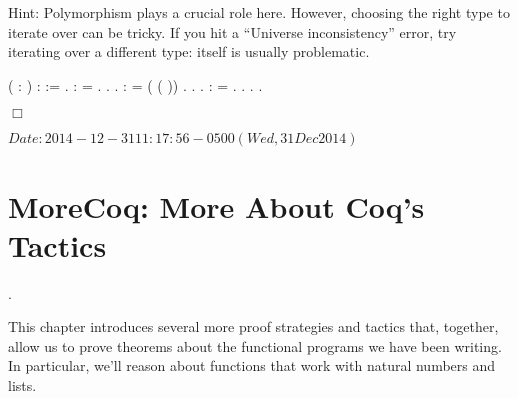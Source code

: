 \documentclass[12pt]{report}
\begin{document}
 Hint: Polymorphism plays a crucial role here. However, choosing
    the right type to iterate over can be tricky. If you hit a
    ``Universe inconsistency'' error, try iterating over a different
    type:  itself is usually problematic. \begin{coqdoccode}
\coqdocemptyline
\coqdocnoindent
{}  (  : ) :  :=\coqdoceol
\coqdocindent{1.00em}
 .\coqdoceol
\coqdocemptyline
\coqdocnoindent
{}  :    =   .\coqdoceol
\coqdocnoindent
{}.  .\coqdoceol
\coqdocemptyline
\coqdocnoindent
{}  :    =  (  (  )) .\coqdoceol
\coqdocnoindent
{}.  .\coqdoceol
\coqdocemptyline
\coqdocnoindent
{}  :    = .\coqdoceol
\coqdocnoindent
{}.  .\coqdoceol
\coqdocemptyline
\coqdocnoindent
{} .\coqdoceol
\coqdocemptyline
\end{coqdoccode}
\ensuremath{\Box} 

 $Date: 2014-12-31 11:17:56 -0500 (Wed, 31 Dec 2014) $ \begin{coqdoccode}
\coqdocemptyline
\end{coqdoccode}

\begin{coqdoccode}
\end{coqdoccode}
\section{MoreCoq: More About Coq's Tactics}

\begin{coqdoccode}
\coqdocemptyline
\coqdocnoindent
{}  .\coqdoceol
\coqdocemptyline
\end{coqdoccode}
This chapter introduces several more proof strategies and
    tactics that, together, allow us to prove theorems about the
    functional programs we have been writing. In particular, we'll
    reason about functions that work with natural numbers and lists.
\end{document}
